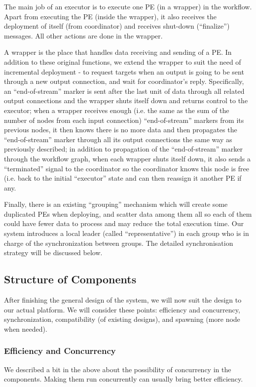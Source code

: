 \documentclass[msc,cs,logo]{infthesis}
\begin{document}
	The main job of an executor is to execute one PE (in a wrapper) in the workflow. Apart from executing the PE (inside the wrapper), it also receives the deployment of itself (from coordinator) and receives shut-down (``finalize'') messages. All other actions are done in the wrapper.
	
	A wrapper is the place that handles data receiving and sending of a PE. In addition to these original functions, we extend the wrapper to suit the need of incremental deployment - to request targets when an output is going to be sent through a new output connection, and wait for coordinator's reply. Specifically, an ``end-of-stream'' marker is sent after the last unit of data through all related output connections and the wrapper shuts itself down and returns control to the executor; when a wrapper receives enough (i.e. the same as the sum of the number of nodes from each input connection) ``end-of-stream'' markers from its previous nodes, it then knows there is no more data and then propagates the ``end-of-stream'' marker through all its output connections the same way as previously described; in addition to propagation of the ``end-of-stream'' marker through the workflow graph, when each wrapper shuts itself down, it also sends a ``terminated'' signal to the coordinator so the coordinator knows this node is free (i.e. back to the initial ``executor'' state and can then reassign it another PE if any.
	
	Finally, there is an existing ``grouping'' mechanism which will create some duplicated PEs when deploying, and scatter data among them all so each of them could have fewer data to process and may reduce the total execution time. Our system introduces a local leader (called ``representative'') in each group who is in charge of the synchronization between groups. The detailed synchronisation strategy will be discussed below.
	
	\subsection{Structure of Components}
	After finishing the general design of the system, we will now suit the design to our actual platform. We will consider these points: efficiency and concurrency, synchronization, compatibility (of existing designs), and spawning (more node when needed).
	
	\subsubsection{Efficiency and Concurrency}
	We described a bit in the above  about the possibility of concurrency in the components. Making them run concurrently can usually bring better efficiency.
	
\end{document}
